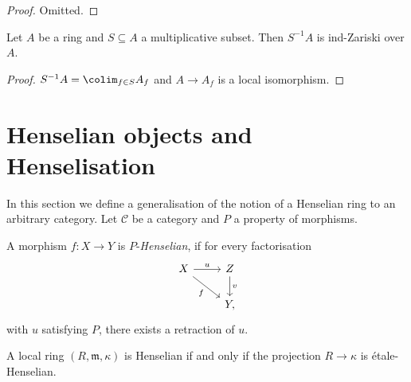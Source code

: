 \begin{proof}
  Omitted.
\end{proof}

\begin{lemma}
    \label{lemma:ind-Zariski-localization}
    Let $A$ be a ring and $S \subseteq A$ a multiplicative subset. Then $S^{-1}A$ is ind-Zariski over $A$.
    \leanok
\end{lemma}

\begin{proof}
    \leanok
    $S^{-1} A = \colim_{f \in S} A_f$ and $A \to A_f$ is a local isomorphism.
\end{proof}

\section{Henselian objects and Henselisation}

In this section we define a generalisation of the notion of a Henselian ring to an arbitrary category. Let $\mathcal{C}$ be a category
and $P$ a property of morphisms.

\begin{definition}[Henselian]
    A morphism $f\colon X \to Y$ is $P$-\emph{Henselian}, if for every factorisation
    \[
    \begin{tikzcd}
        X \arrow{r}{u} \arrow[swap]{dr}{f} & Z \arrow{d}{v} \\
                    & Y,
    \end{tikzcd}
    \] with $u$ satisfying $P$, there exists a retraction of $u$.
    \label{def:p-henselian}
\end{definition}

\begin{example}
    A local ring $(R, \mathfrak{m}, \kappa)$ is Henselian if and only if the projection $R \to \kappa$ is étale-Henselian.
\end{example}

